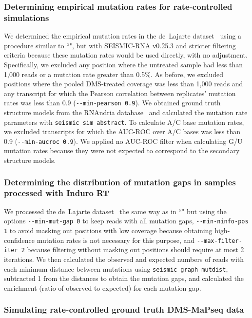 \documentclass[unnumsec,webpdf,contemporary,large]{oup-authoring-template}%
\theoremstyle{thmstyleone}%
\theoremstyle{thmstyletwo}%
\theoremstyle{thmstylethree}%
\begin{document}
\subsubsection{Determining empirical mutation rates for rate-controlled simulations}
\label{empirical-distribution-rate}

We determined the empirical mutation rates in the de~Lajarte dataset~\cite{deLajarte2024} using a procedure similar to ``", but with SEISMIC-RNA v0.25.3 and stricter filtering criteria because these mutation rates would be used directly, with no adjustment.
Specifically, we excluded any position where the untreated sample had less than 1,000 reads or a mutation rate greater than 0.5\%.
As before, we excluded positions where the pooled DMS-treated coverage was less than 1,000 reads and any transcript for which the Pearson correlation between replicates' mutation rates was less than 0.9 (\verb|--min-pearson 0.9|).
We obtained ground truth structure models from the RNAndria database~\cite{deLajarte2024} and calculated the mutation rate parameters with \verb|seismic sim abstract|.
To calculate A/C base mutation rates, we excluded transcripts for which the AUC-ROC over A/C bases was less than 0.9 (\verb|--min-aucroc 0.9|).
We applied no AUC-ROC filter when calculating G/U mutation rates because they were not expected to correspond to the secondary structure models.

\subsubsection{Determining the distribution of mutation gaps in samples processed with Induro RT}

We processed the de~Lajarte dataset~\cite{deLajarte2024} the same way as in ``" but using the options \verb|--min-mut-gap 0| to keep reads with all mutation gaps, \verb|--min-ninfo-pos 1| to avoid masking out positions with low coverage because obtaining high-confidence mutation rates is not necessary for this purpose, and \verb|--max-filter-iter 2| because filtering without masking out positions should require at most 2 iterations.
We then calculated the observed and expected numbers of reads with each minimum distance between mutations using \verb|seismic graph mutdist|, subtracted 1 from the distances to obtain the mutation gaps, and calculated the enrichment (ratio of observed to expected) for each mutation gap.

\subsubsection{Simulating rate-controlled ground truth DMS-MaPseq data}
\label{sim-dms-rate-control}
\end{document}
